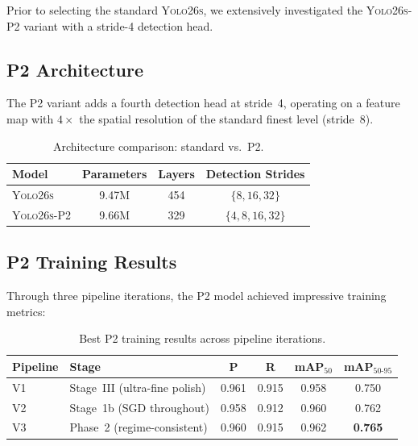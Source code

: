 \documentclass[12pt, titlepage]{article}
\begin{document}
Prior to selecting the standard \textsc{Yolo26s}, we extensively investigated
the \textsc{Yolo26s-P2} variant with a stride-4 detection head.

\subsection{P2 Architecture}

The P2 variant adds a fourth detection head at stride~4, operating on a feature
map with $4{\times}$ the spatial resolution of the standard finest level
(stride~8).

\begin{table}[h]
  \centering
  \caption{Architecture comparison: standard vs.\ P2.}
  \label{tab:arch_compare}
  \begin{tabular}{@{}lccc@{}}
    \toprule
    \textbf{Model}      & \textbf{Parameters} & \textbf{Layers} & \textbf{Detection Strides} \\
    \midrule
    \textsc{Yolo26s}    & 9.47M               & 454             & $\{8, 16, 32\}$            \\
    \textsc{Yolo26s-P2} & 9.66M               & 329             & $\{4, 8, 16, 32\}$         \\
    \bottomrule
  \end{tabular}
\end{table}

\subsection{P2 Training Results}

Through three pipeline iterations, the P2 model achieved impressive training
metrics:

\begin{table}[H]
  \centering
  \caption{Best P2 training results across pipeline iterations.}
  \label{tab:p2_train}
  \small
  \begin{tabular}{@{}llcccc@{}}
    \toprule
    \textbf{Pipeline}   & \textbf{Stage}                & \textbf{P} & \textbf{R} &
    \textbf{mAP$_{50}$} & \textbf{mAP$_{50\text{-}95}$}                                                    \\
    \midrule
    V1                  & Stage~III (ultra-fine polish) & 0.961      & 0.915      & 0.958 & 0.750          \\
    V2                  & Stage~1b (SGD throughout)     & 0.958      & 0.912      & 0.960 & 0.762          \\
    V3                  & Phase~2 (regime-consistent)   & 0.960      & 0.915      & 0.962 & \textbf{0.765} \\
    \bottomrule
  \end{tabular}
\end{table}
\end{document}
